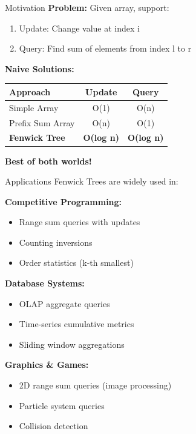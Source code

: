 \documentclass[aspectratio=169]{beamer}
\begin{document}
\begin{frame}{Motivation}
  \textbf{Problem:} Given array, support:
  \begin{enumerate}
    \item Update: Change value at index i
    \item Query: Find sum of elements from index l to r
  \end{enumerate}

  \vspace{0.5cm}
  \textbf{Naive Solutions:}

  \begin{table}
    \centering
    \begin{tabular}{|l|c|c|}
      \hline
      \textbf{Approach} & \textbf{Update} & \textbf{Query} \\
      \hline
      Simple Array & O(1) & O(n) \\
      \hline
      Prefix Sum Array & O(n) & O(1) \\
      \hline
      \textbf{Fenwick Tree} & \textbf{O(log n)} & \textbf{O(log n)} \\
      \hline
    \end{tabular}
  \end{table}

  \vspace{0.5cm}
  \textbf{Best of both worlds!}
\end{frame}

\begin{frame}{Applications}
  Fenwick Trees are widely used in:

  \vspace{0.3cm}
  \textbf{Competitive Programming:}
  \begin{itemize}
    \item Range sum queries with updates
    \item Counting inversions
    \item Order statistics (k-th smallest)
  \end{itemize}

  \vspace{0.3cm}
  \textbf{Database Systems:}
  \begin{itemize}
    \item OLAP aggregate queries
    \item Time-series cumulative metrics
    \item Sliding window aggregations
  \end{itemize}

  \vspace{0.3cm}
  \textbf{Graphics \& Games:}
  \begin{itemize}
    \item 2D range sum queries (image processing)
    \item Particle system queries
    \item Collision detection
  \end{itemize}
\end{frame}
\end{document}
